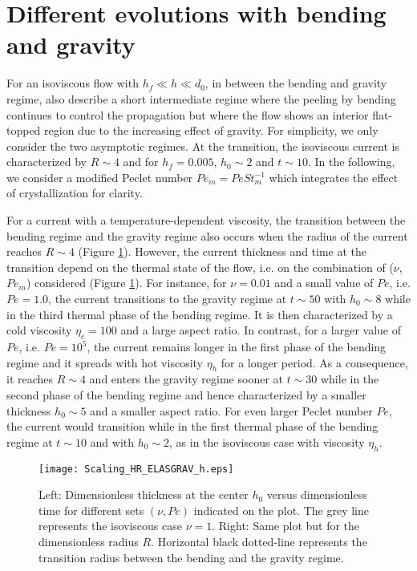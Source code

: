 \section{Different evolutions with bending and gravity}
\label{C3-sec:diff-evol-with-1}

For an isoviscous flow with $h_f\ll h \ll d_0$, in between the bending
and  gravity  regime,  \citet{Lister:2013ia}  also  describe  a  short
intermediate regime where the peeling  by bending continues to control
the  propagation but  where  the flow  shows  an interior  flat-topped
region due  to the  increasing effect of  gravity. For  simplicity, we
only  consider the  two asymptotic  regimes.  At  the transition,  the
isoviscous current  is characterized by $R\sim4$  and for $h_f=0.005$,
$h_0 \sim 2$ and $t \sim 10$. In the following, we consider a modified
Peclet number  $Pe_m =  Pe St_m^{-1}$ which  integrates the  effect of
crystallization for clarity.

For a  current with a temperature-dependent  viscosity, the transition
between the bending regime and the gravity regime also occurs when the
radius    of     the    current    reaches    $R\sim     4$    (Figure
\ref{C3-Scaling_HR_ELASGRAV_h}).  However,  the current  thickness and
time at the  transition depend on the thermal state  of the flow, i.e.
on    the   combination    of   ($\nu$,$Pe_m$)    considered   (Figure
\ref{C3-Scaling_HR_ELASGRAV_h}).  For  instance, for $\nu=0.01$  and a
small value of $Pe$, i.e.  $Pe  = 1.0$, the current transitions to the
gravity regime  at $t \sim  50$ with $h_0 \sim  8$ while in  the third
thermal phase  of the bending  regime. It  is then characterized  by a
cold viscosity  $\eta_c=100$ and a  large aspect ratio.   In contrast,
for a  larger value  of $Pe$,  i.e.  $Pe=  10^5$, the  current remains
longer in  the first phase of  the bending regime and  it spreads with
hot  viscosity $\eta_h$  for a  longer period.   As a  consequence, it
reaches $R \sim 4$ and enters  the gravity regime sooner at $t\sim 30$
while  in   the  second  phase   of  the  bending  regime   and  hence
characterized by a smaller thickness  $h_0\sim 5$ and a smaller aspect
ratio.   For  even  larger  Peclet  number  $Pe$,  the  current  would
transition while in  the first thermal phase of the  bending regime at
$t \sim  10$ and  with $h_0 \sim  2$, as in  the isoviscous  case with
viscosity $\eta_h$.

\begin{figure}[h!]
  \begin{center}
    \graphicspath{ {/Users/thorey/Documents/These/Projet/Refroidissement/Skin_Model/Figure/JFM_V13/} }
    \texttt{[image: Scaling\_HR\_ELASGRAV\_h.eps]}
    \caption{Left: Dimensionless thickness at  the center $h_0$ versus
      dimensionless time  for different  sets $(\nu,Pe)$  indicated on
      the plot.  The grey line represents the isoviscous case $\nu=1$.
      Right:  Same   plot  but  for  the   dimensionless  radius  $R$.
      Horizontal  black dotted-line  represents the  transition radius
      between the bending and the gravity regime.}
    \label{C3-Scaling_HR_ELASGRAV_h}
  \end{center}
\end{figure}

